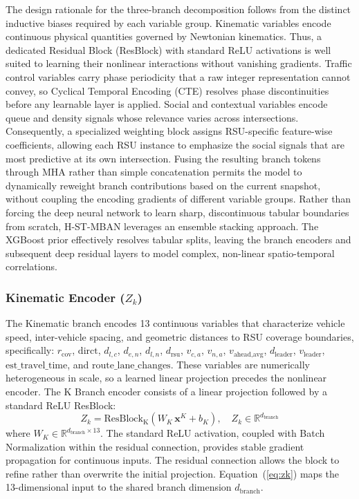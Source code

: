 \documentclass[journal]{IEEEtran}
\begin{document}
The design rationale for the three-branch decomposition follows from the distinct inductive biases required by each variable group.
Kinematic variables encode continuous physical quantities governed by Newtonian kinematics.
Thus, a dedicated Residual Block (ResBlock) with standard ReLU activations is well suited to learning their nonlinear interactions without vanishing gradients.
Traffic control variables carry phase periodicity that a raw integer representation cannot convey, so Cyclical Temporal Encoding (CTE) resolves phase discontinuities before any learnable layer is applied.
Social and contextual variables encode queue and density signals whose relevance varies across intersections.
Consequently, a specialized weighting block assigns RSU-specific feature-wise coefficients, allowing each RSU instance to emphasize the social signals that are most predictive at its own intersection.
Fusing the resulting branch tokens through MHA rather than simple concatenation permits the model to dynamically reweight branch contributions based on the current snapshot, without coupling the encoding gradients of different variable groups.
Rather than forcing the deep neural network to learn sharp, discontinuous tabular boundaries from scratch, H-ST-MBAN leverages an ensemble stacking approach.
The XGBoost prior effectively resolves tabular splits, leaving the branch encoders and subsequent deep residual layers to model complex, non-linear spatio-temporal correlations.


\subsubsection{Kinematic Encoder ($Z_k$)}

The Kinematic branch encodes 13 continuous variables that characterize vehicle speed, inter-vehicle spacing, and geometric distances to RSU coverage boundaries, specifically:
$r_\text{cov}$, $\text{dirct}$, $d_{l,c}$, $d_{e,n}$, $d_{l,n}$, $d_\text{rsu}$, $v_{c,a}$, $v_{n,a}$, $v_\text{ahead,avg}$, $d_\text{leader}$, $v_\text{leader}$, $\text{est\_travel\_time}$, and $\text{route\_lane\_changes}$.
These variables are numerically heterogeneous in scale, so a learned linear projection precedes the nonlinear encoder.
The K Branch encoder consists of a linear projection followed by a standard ReLU ResBlock:
\begin{equation}
Z_k = \text{ResBlock}_\text{K}\!\left(W_K\, \mathbf{x}^K + b_K\right), \quad Z_k \in \mathbb{R}^{d_\text{branch}}
\label{eq:zk}
\end{equation}
where $W_K \in \mathbb{R}^{d_\text{branch} \times 13}$.
The standard ReLU activation, coupled with Batch Normalization within the residual connection, provides stable gradient propagation for continuous inputs.
The residual connection allows the block to refine rather than overwrite the initial projection.
Equation~(\ref{eq:zk}) maps the 13-dimensional input to the shared branch dimension $d_\text{branch}$.
\end{document}
